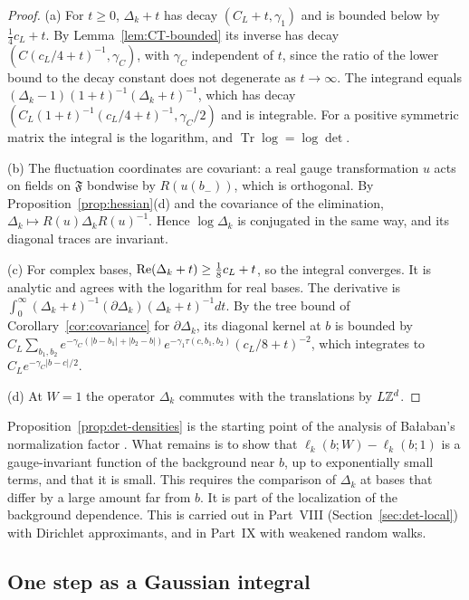 \begin{proof}
(a) For $t\ge0$, $\Delta_k+t$ has decay $(C_L+t,\gamma_1)$ and is bounded below by $\frac14c_L+t$. By Lemma~\ref{lem:CT-bounded} its inverse has decay $(C(c_L/4+t)^{-1},\gamma_C)$, with $\gamma_C$ independent of $t$, since the ratio of the lower bound to the decay constant does not degenerate as $t\to\infty$. The integrand equals $(\Delta_k-1)(1+t)^{-1}(\Delta_k+t)^{-1}$, which has decay $(C_L(1+t)^{-1}(c_L/4+t)^{-1},\gamma_C/2)$ and is integrable. For a positive symmetric matrix the integral is the logarithm, and $\operatorname{Tr}\log=\log\det$.

(b) The fluctuation coordinates are covariant: a real gauge transformation $u$ acts on fields on $\mathfrak F$ bondwise by $R(u(b_-))$, which is orthogonal. By Proposition~\ref{prop:hessian}(d) and the covariance of the elimination, $\Delta_k\mapsto R(u)\Delta_kR(u)^{-1}$. Hence $\log\Delta_k$ is conjugated in the same way, and its diagonal traces are invariant.

(c) For complex bases, $\operatorname{Re}(\Delta_k+t)\ge\frac18c_L+t$, so the integral converges. It is analytic and agrees with the logarithm for real bases. The derivative is $\int_0^\infty(\Delta_k+t)^{-1}(\partial\Delta_k)(\Delta_k+t)^{-1}dt$. By the tree bound of Corollary~\ref{cor:covariance} for $\partial\Delta_k$, its diagonal kernel at $b$ is bounded by $C_L\sum_{b_1,b_2}e^{-\gamma_C(|b-b_1|+|b_2-b|)}e^{-\gamma_1\tau(c,b_1,b_2)}(c_L/8+t)^{-2}$, which integrates to $C_Le^{-\gamma_C|b-c|/2}$.

(d) At $W=1$ the operator $\Delta_k$ commutes with the translations by $L\mathbb Z^d$.
\end{proof}

Proposition~\ref{prop:det-densities} is the starting point of the analysis of Ba\l aban's normalization factor \cite[(61)--(63)]{BalUV3}. What remains is to show that $\ell_k(b;W)-\ell_k(b;1)$ is a gauge-invariant function of the background near $b$, up to exponentially small terms, and that it is small. This requires the comparison of $\Delta_k$ at bases that differ by a large amount far from $b$. It is part of the localization of the background dependence. This is carried out in Part~VIII (Section~\ref{sec:det-local}) with Dirichlet approximants, and in Part~IX with weakened random walks.

\subsection{One step as a Gaussian integral}

